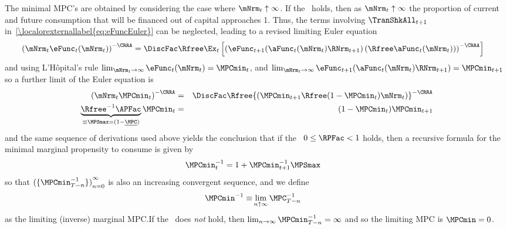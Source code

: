 \documentclass[\econtexRoot/BufferStockTheory]{subfiles}
\begin{document}
The minimal MPC's are obtained by considering the case where $\mNrm_{t} \uparrow \infty$.  If the \FHWC~holds, then as $\mNrm_{t} \uparrow \infty$ the proportion of current and future consumption that will be financed out of capital approaches 1.  Thus, the terms involving $\TranShkAll_{t+1}$ in~\eqref{\localorexternallabel{eq:eFuncEuler}} can be neglected, leading to a revised limiting Euler equation
\begin{eqnarray*}
 {({\mNrm_{t}}\eFunc_{t}(\mNrm_{t}))}^{-\CRRA}  & = \DiscFac \Rfree \Ex_{t}\left[{\left(\eFunc_{t+1}(\aFunc_{t}(\mNrm_{t})\RNrm_{t+1})\left({\Rfree \aFunc_{t}(\mNrm_{t})}\right)\right)}^{-\CRRA}\right]
\end{eqnarray*}
and using L'H\^opital's rule $\lim_{\mNrm_{t} \rightarrow \infty} \eFunc_{t}(\mNrm_{t}) = \MPCmin_{t}$, and $\lim_{\mNrm_{t} \rightarrow \infty} \eFunc_{t+1}(\aFunc_{t}(\mNrm_{t})\RNrm_{t+1}) = \MPCmin_{t+1}$ so a further limit of the Euler equation is\hypertarget{MPCnvrs}{}
\begin{eqnarray*}
  {(\mNrm_{t}\MPCmin_{t})}^{-\CRRA}  & = & \DiscFac \Rfree {\left(\MPCmin_{t+1} \Rfree (1-\MPCmin_{t})\mNrm_{t}\right)}^{-\CRRA}
\\ \underbrace{{\Rfree}^{-1}{\APFac}}_{\equiv \MPSmax = (1-\underline{\MPC})} \MPCmin_{t}  & = & (1-\MPCmin_{t}) \MPCmin_{t+1}
\end{eqnarray*}
and the same sequence of derivations used above yields the conclusion
that if the \RIC~$0 \leq \RPFac < 1$ holds, then a recursive formula for the
minimal marginal propensity to consume is given by
\begin{equation}\begin{gathered}\begin{aligned}
 \MPCmin_{t}^{-1}  & = 1+\MPCmin_{t+1}^{-1}\MPSmax  \label{eq:MPCminInvApndx}
\end{aligned}\end{gathered}\end{equation}
so that ${(\{\MPCmin_{T-n}^{-1}\})}_{n=0}^{\infty}$ is also an increasing
convergent sequence, and we define
\begin{equation}\begin{gathered}\begin{aligned}
\MPCmin^{-1} \equiv &\lim_{n \uparrow \infty} \MPC_{T-n}^{-1}  
\end{aligned}\end{gathered}\end{equation}
as the limiting (inverse) marginal MPC.\@  If the \RIC~does \textit{not} hold, then $\lim_{n \rightarrow \infty} \MPCmin_{T-n}^{-1} = \infty$
and so the limiting MPC is $\MPCmin = 0$.
\end{document}
